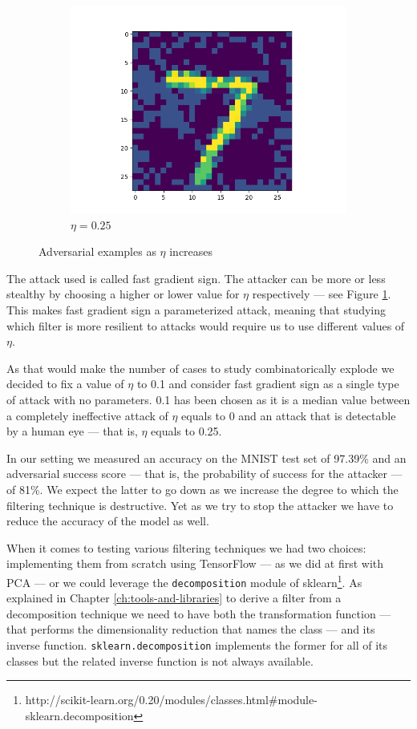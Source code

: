 \begin{figure}
\begin{subfigure}{0.3\linewidth}
    \includegraphics[width=\linewidth]{Images/adversarial-input-fc-100-100-10-025.png}
    \caption{$\eta = 0.25$}
  \end{subfigure}
  \caption{Adversarial examples as $\eta$ increases}
  \label{fig:fgs-increasing-eta}
\end{figure}

The attack used is called fast gradient sign. The attacker can be more or
less stealthy by choosing a higher or lower value for $\eta$
respectively --- see Figure \ref{fig:fgs-increasing-eta}. This makes
fast gradient sign a parameterized attack, meaning that studying which
filter is more resilient to attacks would require us to use different
values of $\eta$.

As that would make the number of cases to study
combinatorically explode we decided to fix a value of $\eta$ to 0.1 and
consider fast gradient sign as a single type of attack with no
parameters. 0.1 has been chosen as it is a median value
between a completely ineffective attack of $\eta$ equals to 0 and an
attack that is detectable by a human eye --- that is, $\eta$ equals
to 0.25.

In our setting we measured an accuracy on the MNIST test set of 97.39\%
and an adversarial success score --- that is, the probability of
success for the attacker --- of 81\%. We expect the latter to go down
as we increase the degree to which the filtering technique is
destructive. Yet as we try to stop the attacker we have to reduce the
accuracy of the model as well.

When it comes to testing various filtering techniques we had two
choices: implementing them from scratch using TensorFlow --- as we did
at first with PCA --- or we could leverage the \texttt{decomposition}
module of
sklearn\footnote{http://scikit-learn.org/0.20/modules/classes.html\#module-sklearn.decomposition}.
As explained in Chapter \ref{ch:tools-and-libraries} to derive a filter
from a decomposition technique we need to have both the transformation
function --- that performs the dimensionality reduction that names the
class --- and its inverse function. \texttt{sklearn.decomposition}
implements the former for all of its classes but the related inverse
function is not always available.

